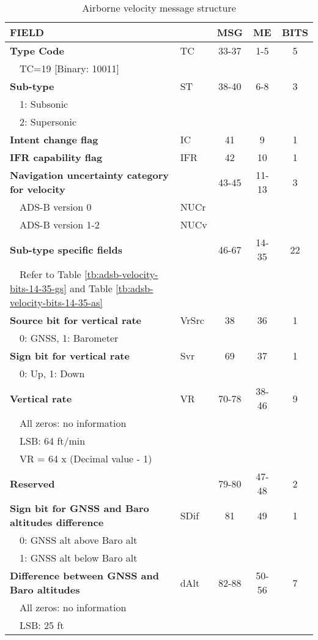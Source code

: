 \begin{table}[]
\caption{Airborne velocity message structure}
\label{tb:adsb-velocity-bits}
\footnotesize
\begin{tabular}{|l|l|c|c|c|}
\hline
\textbf{FIELD} & & \textbf{MSG} & \textbf{ME} & \textbf{BITS} \\ \hline
\hline
\textbf{Type Code} & TC & 33-37 & 1-5 & 5\\
~~TC=19 {[}Binary: 10011{]} &&&& \\ \hline
\textbf{Sub-type} & ST & 38-40 & 6-8 & 3\\
~~1: Subsonic &&&&\\
~~2: Supersonic &&&& \\ \hline
\textbf{Intent change flag} & IC & 41 & 9 & 1 \\ \hline
\textbf{IFR capability flag} & IFR & 42 & 10 & 1 \\ \hline
\textbf{Navigation uncertainty category for velocity} & & 43-45 & 11-13 & 3\\
~~ADS-B version 0 & NUCr &&&\\
~~ADS-B version 1-2 & NUCv &&&\\ \hline
\hline
\textbf{Sub-type specific fields} & & 46-67 & 14-35 & 22\\
~~Refer to Table \ref{tb:adsb-velocity-bits-14-35-gs} and Table \ref{tb:adsb-velocity-bits-14-35-as} &&&& \\ \hline
\hline
\textbf{Source bit for vertical rate} & VrSrc & 38 & 36 & 1 \\
~~0: GNSS, 1: Barometer &&&&\\ \hline
\textbf{Sign bit for vertical rate}  & Svr & 69 & 37 & 1 \\
~~0: Up, 1: Down &&&& \\ \hline
\textbf{Vertical rate} & VR & 70-78 & 38-46 & 9\\
~~All zeros: no information &&&&\\
~~LSB: 64 ft/min &&&&\\
~~VR = 64 x (Decimal value - 1) &&&& \\ \hline
\textbf{Reserved} &  & 79-80 & 47-48 & 2 \\ \hline
\textbf{Sign bit for GNSS and Baro altitudes difference} & SDif & 81 & 49 & 1\\
~~0: GNSS alt above Baro alt &&&& \\
~~1: GNSS alt below Baro alt &&&& \\ \hline
\textbf{Difference between GNSS and Baro altitudes} & dAlt & 82-88 & 50-56 & 7\\
~~All zeros: no information &&&&\\
~~LSB: 25 ft &&&& \\ \hline
\end{tabular}
\end{table}

